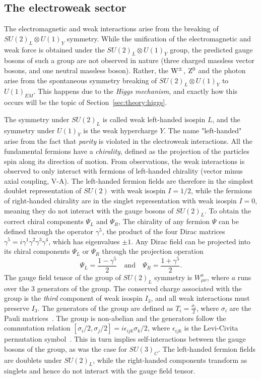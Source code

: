 \subsection{The electroweak sector}
\label{sec:theory:ew}
The electromagnetic and weak interactions arise from the breaking of $SU (2)_L \otimes U(1)_Y$ symmetry. While the unification of the electromagnetic and weak force is obtained under the $SU (2)_L \otimes U(1)_Y$ group, the predicted gauge bosons of such a group are not observed in nature (three charged massless vector bosons, and one neutral massless boson). Rather, the $\mathrm{W}^{\pm}$, $\mathrm{Z}^{0}$ and the photon arise from the spontaneous symmetry breaking of $SU (2)_L \otimes U(1)_Y$ to $U(1)_{EM}$. This happens due to the \emph{Higgs mechanism}, and exactly how this occurs will be the topic of Section~\ref{sec:theory:higgs}.\par
The symmetry under $SU (2)_L$ is called weak left-handed isospin $L$, and the symmetry under $U(1)_Y$ is the weak hypercharge $Y$. The name "left-handed" arise from the fact that \emph{parity} is violated in the electroweak interactions. All the fundamental fermions have a \emph{chirality}, defined as the projection of the particles spin along its direction of motion. From observations, the weak interactions is observed to only interact with fermions of left-handed chirality (vector minus axial coupling, V-A). The left-handed fermion fields are therefore in the simplest doublet representation of $SU(2)$ with weak isospin $I=1/2$, while the fermions of right-handed chirality are in the singlet representation with weak isospin $I=0$, meaning they do not interact with the gauge bosons of $SU (2)_L$. To obtain the correct chiral components $\Psi_L$ and $\Psi_R$,
The chirality of any fermion $\Psi$ can be defined through the operator $\gamma^5$, the product of the four Dirac matrices~\cite{Pauli:1936gd} $\gamma^5=i\gamma^1\gamma^2\gamma^3\gamma^4$, which has eigenvalues $\pm 1$. Any Dirac field can be projected into its chiral components $\Psi_L$ or $\Psi_R$ through the projection operation
\begin{equation}
  \Psi_L = \frac{1-\gamma^5}{2} \quad \textrm{and} \quad \Psi_R = \frac{1+\gamma^5}{2}.
  \end{equation}
The gauge field tensor of the group of $SU (2)_L$ symmetry is $W_{\mu\nu}^a$, where $a$ runs over the 3 generators of the group. The conserved charge associated with the group is the \emph{third} component of weak isospin $I_3$, and all weak interactions must preserve $I_3$. The generators of the group are defined as $T_i=\frac{\sigma_i}{2}$, where $\sigma_i$ are the Pauli matrices~\cite{inbook}. The group is non-abelian and the generators follow the commutation relation $[\sigma_i/2,\sigma_j/2]=i \epsilon_{ijk} \sigma_k/2$, where $\epsilon_{ijk}$ is the Levi-Civita permutation symbol~\cite{Duplij2004}. This in turn implies self-interactions between the gauge bosons of the group, as was the case for $SU(3)_C$. The left-handed fermion fields are doublets under $SU (2)_L$, while the right-handed components transform as singlets and hence do not interact with the gauge field tensor. \newline
